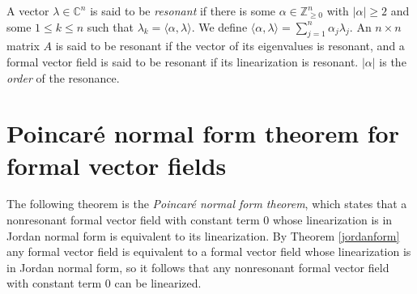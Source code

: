 \documentclass{article}
\theoremstyle{definition}
\begin{document}
A vector $\lambda \in \mathbb{C}^n$ is said to be {\em resonant} if there is some $\alpha \in \mathbb{Z}^n_{\geq 0}$ with
$|\alpha| \geq 2$ and some $1 \leq k \leq n$ such that $\lambda_k = \langle \alpha, \lambda \rangle$.
We define $\langle \alpha,\lambda \rangle=\sum_{j=1}^n \alpha_j \lambda_j$.
An $n \times n$ matrix $A$ is said to be resonant if the vector of its eigenvalues 
is resonant, and a formal vector field is said to be resonant if its linearization is resonant. $|\alpha|$ is the {\em order} of the resonance.

\section{Poincar\'e normal form theorem for formal vector fields}
The following theorem is the {\em Poincar\'e normal form theorem}, which states that a nonresonant formal vector field with constant term $0$ whose linearization is in Jordan normal form is equivalent to its linearization. By Theorem \ref{jordanform} any formal vector field is equivalent to a formal vector field whose linearization is in Jordan normal form,
so it follows that any nonresonant formal vector field with constant term $0$ can be linearized.
\end{document}
